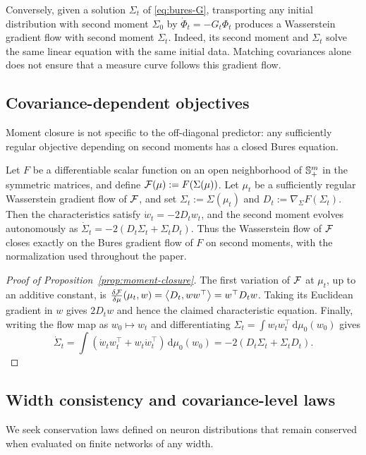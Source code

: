 Conversely, given a solution $\Sigma_t$ of \eqref{eq:bures-G}, transporting
any initial distribution with second moment $\Sigma_0$ by
$\dot\Phi_t=-G_t\Phi_t$ produces a Wasserstein gradient flow with second
moment $\Sigma_t$. Indeed, its second moment and $\Sigma_t$ solve the same
linear equation with the same initial data. Matching covariances alone
does not ensure that a measure curve follows this gradient flow.

\subsection{Covariance-dependent objectives}
Moment closure is not specific to the off-diagonal predictor:
any sufficiently regular objective depending on second moments
has a closed Bures equation.
\begin{proposition}
\label{prop:moment-closure}
Let $F$ be a differentiable scalar function on an open neighborhood of
$\mathbb{S}_{+}^m$ in the symmetric matrices, and define $\mathcal F(\mu):=F(\Sigma(\mu))$.
Let $\mu_t$ be a sufficiently regular Wasserstein gradient flow of $\mathcal F$, and set $\Sigma_t:=\Sigma(\mu_t)$ and $D_t:=\nabla_\Sigma F(\Sigma_t)$.
Then the characteristics satisfy \(\dot w_t=-2D_tw_t\), and the second moment evolves autonomously as
\(\dot\Sigma_t=-2(D_t\Sigma_t+\Sigma_tD_t)\).
Thus the Wasserstein flow of $\mathcal F$ closes exactly on the Bures gradient flow of $F$ on second moments, with the normalization used throughout the paper.
\end{proposition}

\begin{proof}[Proof of Proposition~\ref{prop:moment-closure}]
The first variation of $\mathcal F$ at $\mu_t$, up to an additive constant, is
$\frac{\delta\mathcal F}{\delta\mu}(\mu_t,w)=\left\langle D_t,ww^\top \right\rangle=w^\top D_tw$.
Taking its Euclidean gradient in $w$ gives $2D_tw$ and hence the claimed characteristic equation.
Finally, writing the flow map as $w_0 \mapsto w_t$ and differentiating $\Sigma_t=\int w_tw_t^\top\,\mathrm{d}\mu_0(w_0)$ gives
\[
\dot\Sigma_t=\int \left(\dot w_tw_t^\top+w_t\dot w_t^\top\right)\,\mathrm{d}\mu_0(w_0)=-2(D_t\Sigma_t+\Sigma_tD_t).
\]
\end{proof}


\subsection{Width consistency and covariance-level laws}
We seek conservation laws defined on neuron distributions that remain
conserved when evaluated on finite networks of any width.

